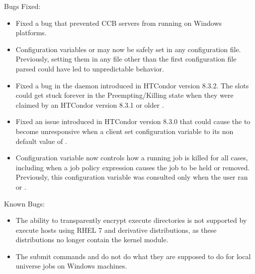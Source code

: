 \noindent Bugs Fixed:

\begin{itemize}

\item Fixed a bug that prevented CCB servers from running on Windows platforms.

\item Configuration variables  or 
 may now be safely set in any configuration file. 
Previously, setting them in any file other than the first configuration file 
parsed could have led to unpredictable behavior.

\item Fixed a bug in the  daemon introduced in HTCondor 
version 8.3.2.
The  slots could get stuck
forever in the Preempting/Killing state when they were claimed by 
an HTCondor version 8.3.1 or older .

\item Fixed an issue introduced in HTCondor version 8.3.0
that could cause the  to become unresponsive when a client 
set configuration variable  
to its non default value of .

\item Configuration variable  now
controls how a running job is killed for all cases,
including when a job policy expression causes the job to be held or removed.
Previously, this configuration variable was consulted only 
when the user ran  or .

\end{itemize}

\noindent Known Bugs:

\begin{itemize}

\item The ability to transparently encrypt execute directories
is not supported by execute hosts using RHEL 7 and derivative distributions,
as these distributions no longer contain the  kernel module.

\item  The submit commands 
 and   
do not do what they are supposed to do
for local universe jobs on Windows machines.
\end{itemize}


